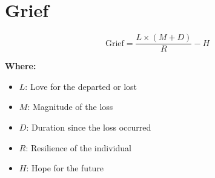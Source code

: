 \chapter{Grief}

\begin{equation}
\text{Grief} = \frac{L \times (M + D)}{R} - H
\end{equation}

\textbf{Where:}

\begin{itemize}
    \item $L$: Love for the departed or lost
    \item $M$: Magnitude of the loss
    \item $D$: Duration since the loss occurred
    \item $R$: Resilience of the individual
    \item $H$: Hope for the future
\end{itemize}
